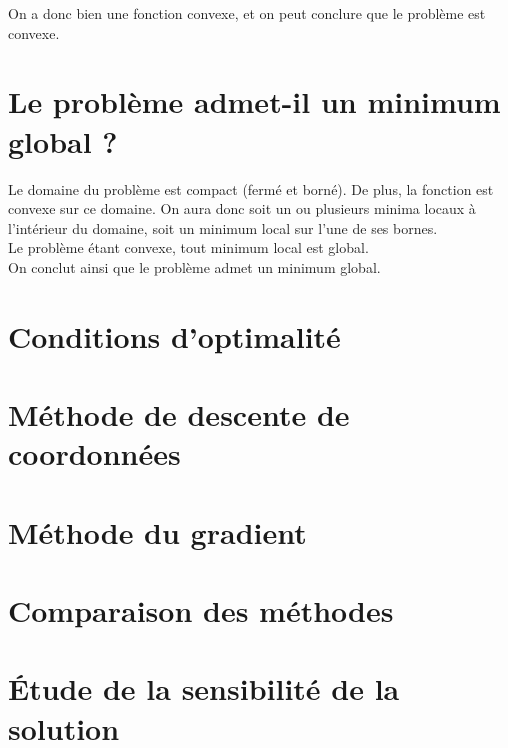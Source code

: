 \documentclass[12pt, a4paper]{report}
\begin{document}
\noindent
\newline
On a donc bien une fonction convexe, et on peut conclure que le problème est convexe.\\


\section{Le problème admet-il un minimum global ?}
Le domaine du problème est compact (fermé et borné). De plus, la fonction est convexe sur ce domaine. On aura donc soit un ou plusieurs minima locaux à l'intérieur du domaine, soit un minimum local sur l'une de ses bornes.\\
Le problème étant convexe, tout minimum local est global.\\
On conclut ainsi que le problème admet un minimum global.\\

\section{Conditions d'optimalité}

\section{Méthode de descente de coordonnées}

\section{Méthode du gradient}

\section{Comparaison des méthodes}

\section{Étude de la sensibilité de la solution}
\end{document}
